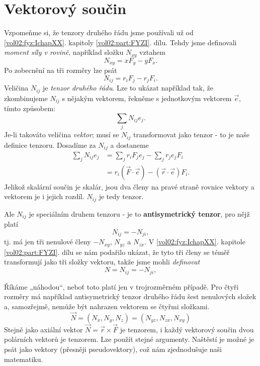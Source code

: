   \section{Vektorový součin}\label{fyz:IIchapXXXIsecV}   
    Vzpomeňme si, že tenzory druhého řádu jsme používali už od \ref{vol02:fyz:IchapXX}. kapitoly
    \ref{vol02:part:FYZI}. dílu. Tehdy jsme definovali \emph{moment síly v rovině}, například složku
    \(N_{xy}\) vztahem 
    \begin{equation*}
      N_{xy} = xF_y-yF_x.
    \end{equation*}
    Po zobecnění na tři rozměry lze psát
    \begin{equation}\label{fyz:eq947}
      N_{ij} = r_iF_j-r_jF_i.
    \end{equation}
    Veličina \(N_{ij}\) je \emph{tenzor druhého řádu}. Lze to ukázat například tak, že zkombinujeme
    \(N_{ij}\) s nějakým vektorem, řekněme s jednotkovým vektorem \(\vec{e}\), tímto způsobem:
    \begin{equation*}
      \sum_jN_{ij}e_j.
    \end{equation*}
    Je-li takováto veličina \emph{vektor}; musí se \(N_{ij}\) transformovat jako tenzor - to je naše
    definice tenzoru. Dosadíme za \(N_{ij}\) a dostaneme
    \begin{align*}
      \sum_jN_{ij}e_j
        &=\sum_jr_iF_je_j-\sum_jr_je_jF_i           \\[1ex]
        &=r_i(\vec{F}\cdot\vec{e})-(\vec{r}\cdot\vec{e})F_i.
    \end{align*}
    Jelikož skalární součin je skalár, jsou dva členy na pravé straně rovnice vektory a vektorem je
    i jejich rozdíl. \(N_{ij}\) je tedy tenzor.

    Ale \(N_{ij}\) je speciálním druhem tenzoru - je to \textbf{antisymetrický tenzor}, pro nějž
    platí
    \begin{equation*}
      N_{ij}=-N_{ji},
    \end{equation*}
    tj. má jen tři nenulové členy \(-N_{xy}\), \(N_{yz}\) a \(N_{zx}\). V \ref{vol02:fyz:IchapXX}.
    kapitole \ref{vol02:part:FYZI}. dílu se nám podařilo ukázat, že tyto tři členy se téměř 
    transformují jako tři složky vektoru, takže jsme mohli \emph{definovat}
    \begin{equation*}
      N = N_{ij}=-N_{ji},
    \end{equation*}
    
    Říkáme „náhodou“, neboť toto platí jen v trojrozměrném případě. Pro čtyři rozměry má například
    antisymetrický tenzor druhého řádu šest nenulových složek a, samozřejmě, nemůže být nahrazen
    vektorem se čtyřmi složkami.
    \begin{equation*}
      \vec{N}=(N_x,N_y,N_z)=(N_{yz},N_{zx},N_{xy})
      \end{equation*}
    Stejně jako axiální vektor \(\vec{N}=\vec{r}\times\vec{F}\) je tenzorem, i každý vektorový
    součin dvou polárních vektorů je tenzorem. Lze použít stejné argumenty. Naštěstí je možné je
    psát jako vektory (přesněji pseudovektory), což nám zjednodušuje naši matematiku.
    
